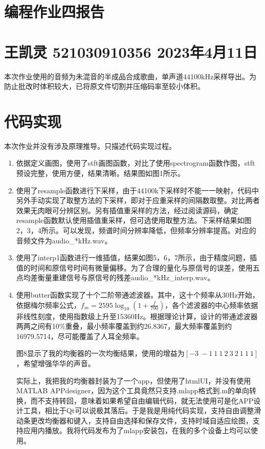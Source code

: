 \documentclass[a4paper]{article}
\begin{document}
	\section*{\Huge 编程作业四报告}
	\section*{\small 王凯灵 521030910356 2023年4月11日}
	本次作业使用的音频为未混音的半成品合成歌曲，单声道44100kHz采样导出。为防止批改时体积较大，已将原文件切割并压缩码率至较小体积。
	\section*{代码实现}
	本次作业并没有涉及原理推导。只描述代码实现过程。
	\begin{enumerate}
		\item 依据定义画图，使用了stft画图函数，对比了使用spectrogram函数作图，stft预设完整，使用方便，结果清晰。结果图如图1所示。
		\item 使用了resample函数进行下采样，由于44100k下采样时不能一一映射，代码中另外手动实现了取整方法的下采样，即对于应重采样的间隔数取整。对比两者效果无肉眼可分辨区别。另有插值重采样的方法，经过阅读源码，确定resample函数默认使用插值重采样，但可选使用取整方法。下采样结果如图2，3，4所示。可以发现，频谱时间分辨率降低，但频率分辨率提高。对应的音频文件为audio\_*kHz.wav。
		\item 使用了interp1函数进行一维插值，结果如图5，6，7所示，由于精度问题，插值的时间和原信号时间有微量偏移。为了合理的量化与原信号的误差，使用五点均差衡量重建信号与原信号的残差audio\_*kHz\_interp.wav。
		\item 使用butter函数实现了十个二阶带通滤波器。其中，这十个频率从30Hz开始，依据梅尔频率公式，$f_m = 2595 \log_{10}(1+\frac{f}{700})$，各个滤波器的中心频率依据非线性刻度，使用指数级上升至15360Hz。根据理论计算，设计的带通滤波器两两之间有10\%重叠，最小频率覆盖到约26.8367，最大频率覆盖到约16979.5714，尽可能覆盖了人耳全频率。
		
		图8显示了我的均衡器的一次均衡结果，使用的增益为$[-3~-1~1~1~2~3~2~1~1~1]$，希望增强华华的声音。
		
		实际上，我把我的均衡器封装为了一个app，但使用了htmlUI，并没有使用MATLAB APPdesigner，因为这个工具竟然只支持.mlapp格式到.m的单向转换，而不支持转回，意味着如果希望自由编辑代码，就无法使用可是化APP设计工具，相比于Qt可以说极其落后。于是我是用纯代码实现，支持自由调整滑动条更改均衡器和键入，支持自由选择和保存文件，支持时域自适应绘图，支持应用内播放。我将代码发布为了mlapp安装包，在我的多个设备上均可以使用。	
	\end{enumerate}
\end{document}

